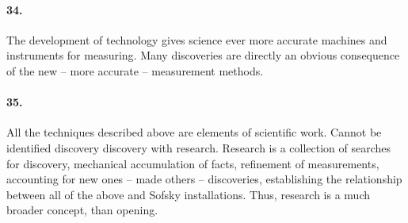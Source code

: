 \documentclass[11pt,a4paper]{article}
\begin{document}
\paragraph{34.}
The development of technology gives science ever more accurate machines and
instruments for measuring.  Many discoveries are directly an obvious
consequence of the new -- more accurate -- measurement methods.

\paragraph{35.}
All the techniques described above are elements of scientific work. Cannot be
identified discovery discovery with research. Research is a collection of
searches for discovery, mechanical accumulation of facts, refinement of
measurements, accounting for new ones -- made others -- discoveries,
establishing the relationship between all of the above and Sofsky
installations. Thus, research is a much broader concept, than opening.
\vfill

\ccnotice
\end{document}
